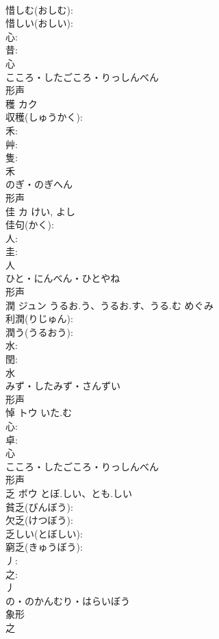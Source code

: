 \documentclass[8pt]{extreport}
\begin{document}
\begin{CJK}{UTF8}{min}
\\	惜しむ(おしむ): 
\\	惜しい(おしい): 
\\	心: 
\\	昔: 
\\	心	
\\	こころ・したごころ・りっしんべん	
\\	形声 
\\	穫	カク			
\\	収穫(しゅうかく): 
\\	禾: 
\\	艸: 
\\	隻: 
\\	禾	
\\	のぎ・のぎへん	
\\	形声 
\\	佳	カ		けい, よし	
\\	佳句(かく): 
\\	人: 
\\	圭: 
\\	人	
\\	ひと・にんべん・ひとやね	
\\	形声 
\\	潤	ジュン	うるお.う、うるお.す、うる.む	めぐみ	
\\	利潤(りじゅん): 
\\	潤う(うるおう): 
\\	水: 
\\	閏: 
\\	水	
\\	みず・したみず・さんずい	
\\	形声 
\\	悼	トウ	いた.む		
\\	心: 
\\	卓: 
\\	心	
\\	こころ・したごころ・りっしんべん	
\\	形声 
\\	乏	ボウ	とぼ.しい、とも.しい		
\\	貧乏(びんぼう): 
\\	欠乏(けつぼう): 
\\	乏しい(とぼしい): 
\\	窮乏(きゅうぼう): 
\\	丿: 
\\	之: 
\\	丿	
\\	の・のかんむり・はらいぼう	
\\	象形 
\\	之 

\end{CJK}
\end{document}
